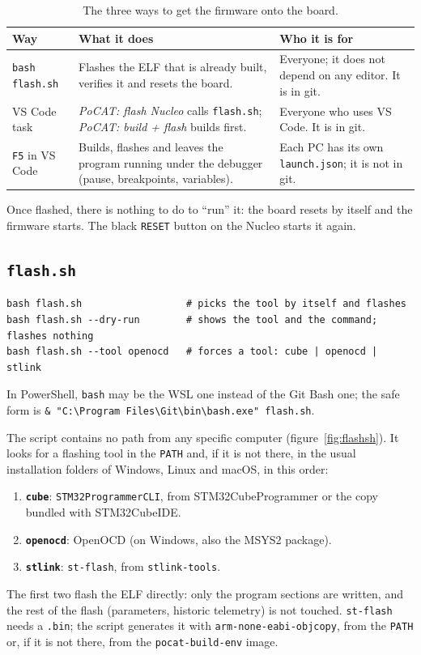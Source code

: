 \documentclass[11pt,a4paper]{article}
\DeclareRobustCommand{\_}{\textunderscore\allowbreak}
\newcommand{\cd}[1]{\texttt{#1}}
\begin{document}
\begin{table}[H]
\centering\small
\begin{tabularx}{\textwidth}{@{}>{\raggedright\arraybackslash}p{3.6cm}>{\raggedright\arraybackslash}X>{\raggedright\arraybackslash}p{4.4cm}@{}}
\toprule
Way & What it does & Who it is for\\
\midrule
\cd{bash flash.sh} & Flashes the ELF that is already built, verifies it and resets the board. & Everyone; it does not depend on any editor. It is in git.\\
VS Code task & \emph{PoCAT: flash Nucleo} calls \cd{flash.sh}; \emph{PoCAT: build + flash} builds first. & Everyone who uses VS Code. It is in git.\\
\cd{F5} in VS Code & Builds, flashes and leaves the program running under the debugger (pause, breakpoints, variables). & Each PC has its own \cd{launch.json}; it is not in git.\\
\bottomrule
\end{tabularx}
\caption{The three ways to get the firmware onto the board.}
\end{table}

Once flashed, there is nothing to do to ``run'' it: the board resets by itself and the firmware
starts. The black \cd{RESET} button on the Nucleo starts it again.

\subsection{\texorpdfstring{\cd{flash.sh}}{flash.sh}}

\begin{lstlisting}
bash flash.sh                  # picks the tool by itself and flashes
bash flash.sh --dry-run        # shows the tool and the command; flashes nothing
bash flash.sh --tool openocd   # forces a tool: cube | openocd | stlink
\end{lstlisting}
In PowerShell, \cd{bash} may be the WSL one instead of the Git Bash one; the safe form is
\cd{\& "C:\textbackslash Program Files\textbackslash Git\textbackslash bin\textbackslash bash.exe" flash.sh}.

The script contains no path from any specific computer (figure~\ref{fig:flashsh}). It looks for a
flashing tool in the \cd{PATH} and, if it is not there, in the usual installation folders of
Windows, Linux and macOS, in this order:
\begin{enumerate}
\item \textbf{\cd{cube}}: \cd{STM32\_Programmer\_CLI}, from STM32CubeProgrammer or the copy bundled with STM32CubeIDE.
\item \textbf{\cd{openocd}}: OpenOCD (on Windows, also the MSYS2 package).
\item \textbf{\cd{stlink}}: \cd{st-flash}, from \cd{stlink-tools}.
\end{enumerate}
The first two flash the ELF directly: only the program sections are written, and
the rest of the flash (parameters, historic telemetry) is not touched. \cd{st-flash} needs
a \cd{.bin}; the script generates it with \cd{arm-none-eabi-objcopy}, from the \cd{PATH} or, if it is not
there, from the \cd{pocat-build-env} image.
\end{document}
